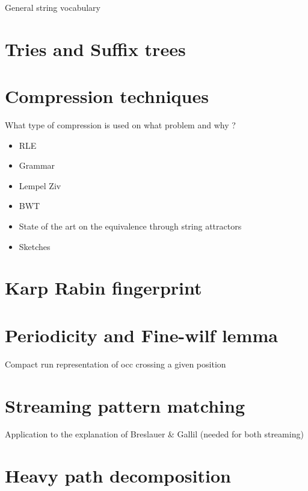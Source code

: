 
General string vocabulary


\section{Tries and Suffix trees}

\section{Compression techniques}
What type of compression is used on what problem and why ?
\begin{itemize}
\item RLE
\item Grammar
\item Lempel Ziv
\item BWT
\item State of the art on the equivalence through string attractors
\item Sketches
\end{itemize}


\section{Karp Rabin fingerprint} 
\section{Periodicity and Fine-wilf lemma}
Compact run representation of occ crossing a given position

\section{Streaming pattern matching}
Application to the explanation of Breslauer \& Gallil (needed for both streaming)

\section{Heavy path decomposition}